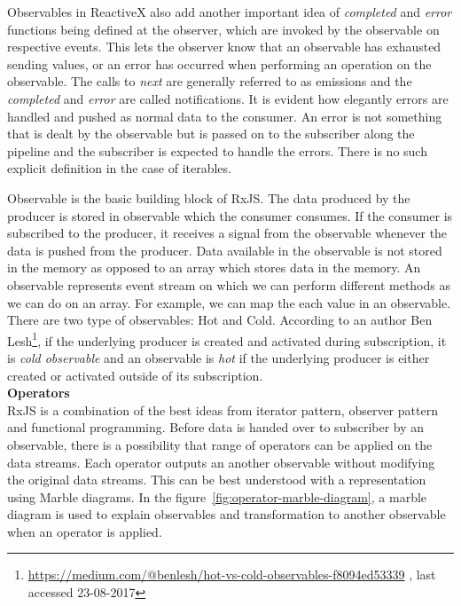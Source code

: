 Observables in ReactiveX also add another important idea of \textit{completed} and \textit{error} functions being defined at the observer, which are invoked by the observable on respective events. This lets the observer know that an observable has exhausted sending values, or an error has occurred when performing an operation on the observable. The calls to \textit{next} are generally referred to as emissions and the \textit{completed} and \textit{error} are called notifications. It is evident how elegantly errors are handled and pushed as normal data to the consumer. An error is not something that is dealt by the observable but is passed on to the subscriber along the pipeline and the subscriber is expected to handle the errors. There is no such explicit definition in the case of iterables.  

Observable is the basic building block of RxJS. The data produced by the producer is stored in observable which the consumer consumes. If the consumer is subscribed to the producer, it receives a signal from the observable whenever the data is pushed from the producer. Data available in the observable is not stored in the memory as opposed to an array which stores data in the memory. An observable represents event stream on which we can perform different methods as we can do on an array. For example, we can map the each value in an observable. There are two type of observables: Hot and Cold. According to an author Ben Lesh\footnote{\url{https://medium.com/@benlesh/hot-vs-cold-observables-f8094ed53339} , last accessed 23-08-2017}, if the underlying producer is created and activated during subscription, it is \textit{cold observable} and an observable is \textit{hot} if the underlying producer is either created or activated outside of its subscription.
\\
\textbf{Operators}
\\
RxJS is a combination of the best ideas from iterator pattern, observer pattern and functional programming\cite{reactiveX}. Before data is handed over to subscriber by an observable, there is a possibility that range of operators can be applied on the data streams. Each operator outputs an another observable without modifying the original data streams. This can be best understood with a representation using Marble diagrams. In the figure~\ref{fig:operator-marble-diagram},  a marble diagram is used to explain observables and transformation to another observable when an operator is applied. 

